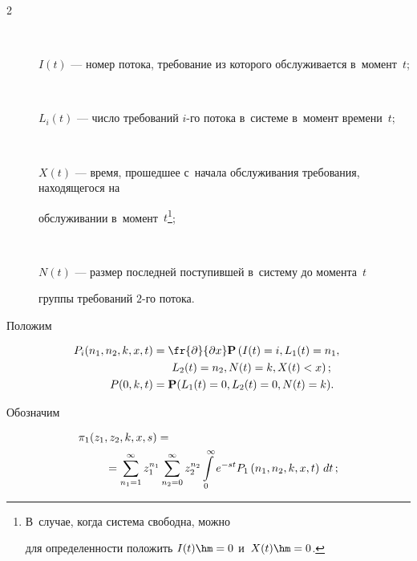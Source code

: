 \begin{multicols}{2}
\begin{description}


\item[\,] $I(t)$ --- номер потока, требование из которого обслуживается в~момент~$t$;


\item[\,]$L_i(t)$ --- число требований $i$-го потока в~системе в~момент времени~$t$;


\item[\,]$X(t)$ --- время, прошедшее с~начала обслуживания требования, находящегося на 


обслуживании в~момент~$t$\footnote{В~случае, когда система свободна, можно 


для определенности положить $I(t)\hm=0$ и~$X(t)\hm=0$.};


\item[\,]$N(t)$ --- размер последней поступившей в~систему до момента~$t$ 


группы требований $2$-го потока.


\end{description}


Положим


\begin{align*}


P_i(n_1,n_2,k,x,t)&=\fr{\partial}{\partial x}


\mathbf{P}\left(I(t)=i,L_1(t)=n_1,\right.\\


&\hspace*{14pt}\left.L_2(t)=n_2,N(t)=k,X(t)<x\right);\\


P(0,k,t)&=\mathbf{P}(L_1(t)=0,L_2(t)=0,N(t)=k).\hspace*{-2pt}


\end{align*}





Обозначим


\begin{align*}


\pi_1(z_1,z_2,k,x,s)&=\\


&\hspace*{-46pt}{}=\sum\limits_{n_1=1}^{\infty}z_1^{n_1}


\sum\limits_{n_2=0}^{\infty}z_2^{n_2}


\int\limits_0^{\infty}e^{-st}P_1\left(n_1,n_2,k,x,t\right)\,dt\,;\\



\end{align*}
\end{multicols}
